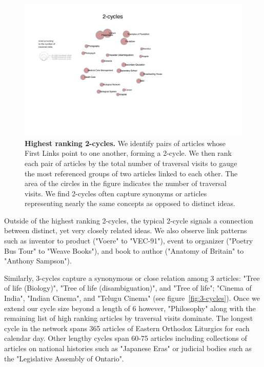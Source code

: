 \documentclass[pre,twocolumn,twoside,superscriptaddress,floatfix, aps, 10pt]{revtex4-1}
\begin{document}
\begin{figure}[tp!]
  \centering	
  \includegraphics[width=\textwidth]{graphics/2_cycles.pdf}
  \caption{
    \textbf{Highest ranking 2-cycles.}
    We identify pairs of articles whose First Links point to one another, forming
    a 2-cycle. We then rank each pair of articles by the total number of 
    traversal visits to gauge the most referenced groups of two articles linked
    to each other. The area of the circles in the figure indicates the number of traversal visits. We find 2-cycles often capture synonyms or articles representing nearly the 
    same concepts as opposed to distinct ideas.
  }
  \label{fig:2-cycles}
\end{figure}

Outside of the highest ranking 2-cycles, the typical 2-cycle signals a connection between distinct, yet very closely related ideas. 
We also observe link patterns such as inventor to product ("Voere" to "VEC-91"), event to organizer ("Poetry Bus Tour" to "Weave Books"), and book to author ("Anatomy of Britain" to "Anthony Sampson").

Similarly, 3-cycles capture a synonymous or close relation among 3 articles: "Tree of life (Biology)", "Tree of life (disambiguation)", 
and "Tree of life"; "Cinema of India", "Indian Cinema", and "Telugu Cinema"
(see figure~\ref{fig:3-cycles}).
Once we extend our cycle size beyond a length of 6 however, 
"Philosophy" along with the remaining list of high ranking articles by traversal visits dominate.
The longest cycle in the network spans 365 articles of Eastern Orthodox Liturgics for each calendar day.
Other lengthy cycles span 60-75 articles including collections of articles on national histories such as "Japanese Eras" 
or judicial bodies such as the "Legislative Assembly of Ontario".
\end{document}
